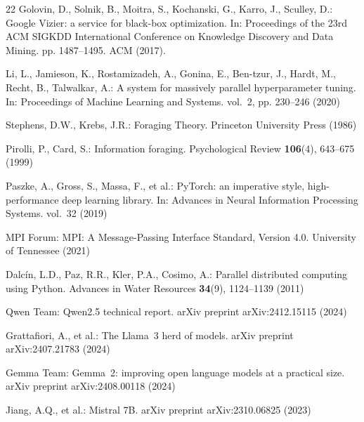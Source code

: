\documentclass[runningheads]{llncs}
\begin{document}
\begin{thebibliography}{22}
Golovin, D., Solnik, B., Moitra, S., Kochanski, G., Karro, J., Sculley, D.: Google {Vizier}: a service for black-box optimization. In: Proceedings of the 23rd ACM SIGKDD International Conference on Knowledge Discovery and Data Mining. pp. 1487--1495. ACM (2017). 

Li, L., Jamieson, K., Rostamizadeh, A., Gonina, E., Ben-tzur, J., Hardt, M., Recht, B., Talwalkar, A.: A system for massively parallel hyperparameter tuning. In: Proceedings of Machine Learning and Systems. vol.~2, pp. 230--246 (2020)

Stephens, D.W., Krebs, J.R.: Foraging Theory. Princeton University Press (1986)

Pirolli, P., Card, S.: Information foraging. Psychological Review \textbf{106}(4), 643--675 (1999)

Paszke, A., Gross, S., Massa, F., et al.: {PyTorch}: an imperative style, high-performance deep learning library. In: Advances in Neural Information Processing Systems. vol.~32 (2019)

{MPI Forum}: {MPI}: A Message-Passing Interface Standard, Version 4.0. University of Tennessee (2021)

Dalc{\'i}n, L.D., Paz, R.R., Kler, P.A., Cosimo, A.: Parallel distributed computing using {Python}. Advances in Water Resources \textbf{34}(9), 1124--1139 (2011)

Qwen Team: {Qwen2.5} technical report. arXiv preprint arXiv:2412.15115 (2024)

Grattafiori, A., et al.: The {Llama}~3 herd of models. arXiv preprint arXiv:2407.21783 (2024)

Gemma Team: {Gemma}~2: improving open language models at a practical size. arXiv preprint arXiv:2408.00118 (2024)

Jiang, A.Q., et al.: {Mistral} {7B}. arXiv preprint arXiv:2310.06825 (2023)

\end{thebibliography}
\end{document}
